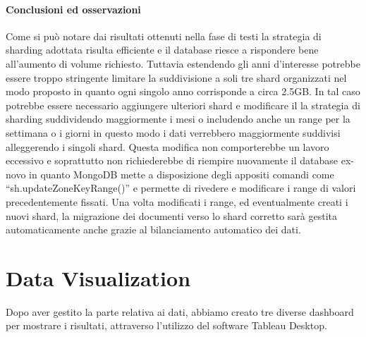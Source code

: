 \documentclass[12pt]{article}
\begin{document}
\subsection{Conclusioni ed osservazioni}
Come si può notare dai risultati ottenuti nella fase di testi la strategia di sharding adottata risulta efficiente e il database riesce a rispondere bene all'aumento di volume richiesto. Tuttavia estendendo gli anni d'interesse potrebbe essere troppo stringente limitare la suddivisione a soli tre shard organizzati nel modo proposto in quanto ogni singolo anno corrisponde a circa 2.5GB. In tal caso potrebbe essere necessario aggiungere ulteriori shard e modificare il la strategia di sharding suddividendo maggiormente i mesi o includendo anche un range per la settimana o i giorni in questo modo i dati verrebbero maggiormente suddivisi alleggerendo i singoli shard. Questa modifica non comporterebbe un lavoro eccessivo e soprattutto non richiederebbe di riempire nuovamente il database ex-novo in quanto MongoDB mette a disposizione degli appositi comandi come ``sh.updateZoneKeyRange()'' e permette di rivedere e modificare i range di valori precedentemente fissati. Una volta modificati i range, ed eventualmente creati i nuovi shard, la migrazione dei documenti verso lo shard corretto sarà gestita automaticamente anche grazie al bilanciamento automatico dei dati.

\newpage
\part{Data Visualization}
Dopo aver gestito la parte relativa ai dati, abbiamo creato tre diverse dashboard per mostrare i risultati, attraverso l'utilizzo del software Tableau Desktop.
\end{document}
